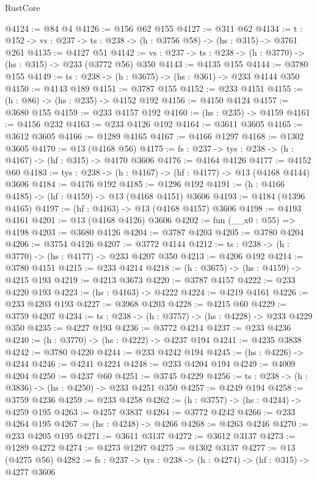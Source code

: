 \begin{lexlean}{RustCore}
\begin{coremodule}
@4124 := @84 @4
@4126 := @156 @62 @155
@4127 := @311 @62
@4134 := {t : @152} -> {vs : @237} -> {ts : @238} -> (h : @3756 @58) -> (hs : @315) -> @3761 @261
@4135 := @4127 @51
@4142 := {vs : @237} -> {ts : @238} -> (h : @3770) -> (hs : @315) -> @233 (@3772 @56) @350
@4143 := @4135 @155
@4144 := @3780 @155
@4149 := {ts : @238} -> (h : @3675) -> (hs : @361) -> @233 @4144 @350
@4150 := @4143 @189
@4151 := @3787 @155
@4152 := @233 @4151
@4155 := (h : @86) -> (hs : @235) -> @4152 @192
@4156 := @4150 @4124
@4157 := @3680 @155
@4159 := @233 @4157 @192
@4160 := (hs : @235) -> @4159
@4161 := @4156 @232
@4163 := @233 @4126 @192
@4164 := @3611 @3605
@4165 := @3612 @3605
@4166 := @1289 @4165
@4167 := @4166 @1297
@4168 := @1302 @3605
@4170 := @13 (@4168 @56)
@4175 := {fs : @237} -> {tys : @238} -> (h : @4167) -> (hf : @315) -> @4170 @3606
@4176 := @4164 @4126
@4177 := @4152 @60
@4183 := {tys : @238} -> (h : @4167) -> (hf : @4177) -> @13 (@4168 @4144) @3606
@4184 := @4176 @192
@4185 := @1296 @192
@4191 := (h : @4166 @4185) -> (hf : @4159) -> @13 (@4168 @4151) @3606
@4193 := @4184 (@1396 @4165)
@4197 := (hf : @4163) -> @13 (@4168 @4157) @3606
@4198 := @4193 @4161
@4201 := @13 (@4168 @4126) @3606
@4202 := fun (__x0 : @55) => @4198
@4203 := @3680 @4126
@4204 := @3787 @4203
@4205 := @3780 @4204
@4206 := @3754 @4126
@4207 := @3772 @4144
@4212 := {ts : @238} -> (h : @3770) -> (hs : @4177) -> @233 @4207 @350
@4213 := @4206 @192
@4214 := @3780 @4151
@4215 := @233 @4214
@4218 := (h : @3675) -> (hs : @4159) -> @4215 @193
@4219 := @4213 @3673
@4220 := @3787 @4157
@4222 := @233 @4220 @193
@4223 := (hs : @4163) -> @4222
@4224 := @4219 @4161
@4226 := @233 @4203 @193
@4227 := @3968 @4203
@4228 := @4215 @60
@4229 := @3759 @4207
@4234 := {ts : @238} -> (h : @3757) -> (hs : @4228) -> @233 @4229 @350
@4235 := @4227 @193
@4236 := @3772 @4214
@4237 := @233 @4236
@4240 := (h : @3770) -> (hs : @4222) -> @4237 @194
@4241 := @4235 @3838
@4242 := @3780 @4220
@4244 := @233 @4242 @194
@4245 := (hs : @4226) -> @4244
@4246 := @4241 @4224
@4248 := @233 @4204 @194
@4249 := @4009 @4204
@4250 := @4237 @60
@4251 := @3745 @4229
@4256 := {ts : @238} -> (h : @3836) -> (hs : @4250) -> @233 @4251 @350
@4257 := @4249 @194
@4258 := @3759 @4236
@4259 := @233 @4258
@4262 := (h : @3757) -> (hs : @4244) -> @4259 @195
@4263 := @4257 @3837
@4264 := @3772 @4242
@4266 := @233 @4264 @195
@4267 := (hs : @4248) -> @4266
@4268 := @4263 @4246
@4270 := @233 @4205 @195
@4271 := @3611 @3137
@4272 := @3612 @3137
@4273 := @1289 @4272
@4274 := @4273 @1297
@4275 := @1302 @3137
@4277 := @13 (@4275 @56)
@4282 := {fs : @237} -> {tys : @238} -> (h : @4274) -> (hf : @315) -> @4277 @3606

\end{coremodule}
\end{lexlean}

